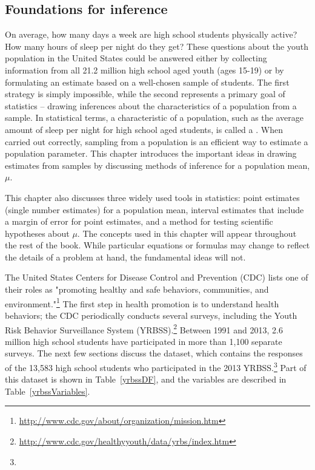 
\begin{spacing}{1.5}

\chapter{Foundations for inference}
\label{foundationsForInference}

On average, how many days a week are high school students physically active? How many hours of sleep per night do they get? These questions about the youth population in the United States could be answered either by collecting information from all 21.2 million high school aged youth (ages 15-19) or by formulating an estimate based on a well-chosen sample of students. The first strategy is simply impossible, while the second represents a primary goal of statistics -- drawing inferences about the characteristics of a population from a sample. In statistical terms, a characteristic of a population, such as the average amount of sleep per night for high school aged students, is called a . When carried out correctly, sampling from a population is an efficient way to estimate a population parameter. This chapter introduces the important ideas in drawing estimates from samples by discussing methods of inference for a population mean, $\mu$. 

This chapter also discusses three widely used tools in statistics: point estimates (single number estimates) for a population mean, interval estimates that include a margin of error for point estimates, and a method for testing scientific hypotheses about $\mu$. The concepts used in this chapter will appear throughout the rest of the book. While particular equations or formulas may change to reflect the details of a problem at hand, the fundamental ideas will not. 


The United States Centers for Disease Control and Prevention (CDC) lists one of their roles as "promoting healthy and safe behaviors, communities, and environment."\footnote{\url{http://www.cdc.gov/about/organization/mission.htm}} The first step in health promotion is to understand health behaviors; the CDC periodically conducts several surveys, including the Youth Risk Behavior Surveillance System (YRBSS).\footnote{\url{http://www.cdc.gov/healthyyouth/data/yrbs/index.htm}} Between 1991 and 2013, 2.6 million high school students have participated in more than 1,100 separate surveys. The next few sections discuss the  dataset, which contains the responses of the 13,583 high school students who participated in the 2013 YRBSS.\footnote{} Part of this dataset is shown in Table~\ref{yrbssDF}, and the variables are described in Table~\ref{yrbssVariables}.


\end{spacing}
